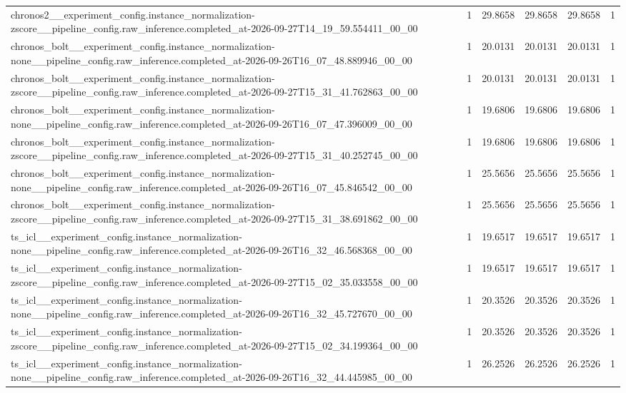 \begin{tabular}{llllll}
chronos2\_\_experiment\_config.instance\_normalization-zscore\_\_pipeline\_config.raw\_inference.completed\_at-2026-09-27T14\_19\_59.554411\_00\_00 & 1 & 29.8658 & 29.8658 & 29.8658 & 1 \\
chronos\_bolt\_\_experiment\_config.instance\_normalization-none\_\_pipeline\_config.raw\_inference.completed\_at-2026-09-26T16\_07\_48.889946\_00\_00 & 1 & 20.0131 & 20.0131 & 20.0131 & 1 \\
chronos\_bolt\_\_experiment\_config.instance\_normalization-zscore\_\_pipeline\_config.raw\_inference.completed\_at-2026-09-27T15\_31\_41.762863\_00\_00 & 1 & 20.0131 & 20.0131 & 20.0131 & 1 \\
chronos\_bolt\_\_experiment\_config.instance\_normalization-none\_\_pipeline\_config.raw\_inference.completed\_at-2026-09-26T16\_07\_47.396009\_00\_00 & 1 & 19.6806 & 19.6806 & 19.6806 & 1 \\
chronos\_bolt\_\_experiment\_config.instance\_normalization-zscore\_\_pipeline\_config.raw\_inference.completed\_at-2026-09-27T15\_31\_40.252745\_00\_00 & 1 & 19.6806 & 19.6806 & 19.6806 & 1 \\
chronos\_bolt\_\_experiment\_config.instance\_normalization-none\_\_pipeline\_config.raw\_inference.completed\_at-2026-09-26T16\_07\_45.846542\_00\_00 & 1 & 25.5656 & 25.5656 & 25.5656 & 1 \\
chronos\_bolt\_\_experiment\_config.instance\_normalization-zscore\_\_pipeline\_config.raw\_inference.completed\_at-2026-09-27T15\_31\_38.691862\_00\_00 & 1 & 25.5656 & 25.5656 & 25.5656 & 1 \\
ts\_icl\_\_experiment\_config.instance\_normalization-none\_\_pipeline\_config.raw\_inference.completed\_at-2026-09-26T16\_32\_46.568368\_00\_00 & 1 & 19.6517 & 19.6517 & 19.6517 & 1 \\
ts\_icl\_\_experiment\_config.instance\_normalization-zscore\_\_pipeline\_config.raw\_inference.completed\_at-2026-09-27T15\_02\_35.033558\_00\_00 & 1 & 19.6517 & 19.6517 & 19.6517 & 1 \\
ts\_icl\_\_experiment\_config.instance\_normalization-none\_\_pipeline\_config.raw\_inference.completed\_at-2026-09-26T16\_32\_45.727670\_00\_00 & 1 & 20.3526 & 20.3526 & 20.3526 & 1 \\
ts\_icl\_\_experiment\_config.instance\_normalization-zscore\_\_pipeline\_config.raw\_inference.completed\_at-2026-09-27T15\_02\_34.199364\_00\_00 & 1 & 20.3526 & 20.3526 & 20.3526 & 1 \\
ts\_icl\_\_experiment\_config.instance\_normalization-none\_\_pipeline\_config.raw\_inference.completed\_at-2026-09-26T16\_32\_44.445985\_00\_00 & 1 & 26.2526 & 26.2526 & 26.2526 & 1 \\

\end{tabular}
